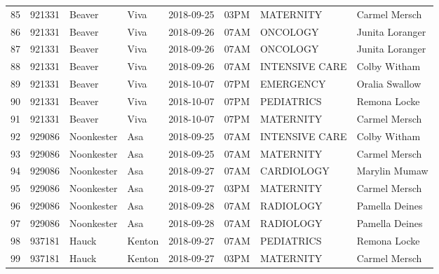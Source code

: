 \documentclass[11pt]{article}
\begin{document}
\begin{tabular}{|l|l|l|l|l|l|l|l|}
	85 &  921331 &      Beaver &      Viva &      2018-09-25 &  03PM &       MATERNITY &    Carmel Mersch \\
	86 &  921331 &      Beaver &      Viva &      2018-09-26 &  07AM &        ONCOLOGY &  Junita Loranger \\
	87 &  921331 &      Beaver &      Viva &      2018-09-26 &  07AM &        ONCOLOGY &  Junita Loranger \\
	88 &  921331 &      Beaver &      Viva &      2018-09-26 &  07AM &  INTENSIVE CARE &     Colby Witham \\
	89 &  921331 &      Beaver &      Viva &      2018-10-07 &  07PM &       EMERGENCY &   Oralia Swallow \\
	90 &  921331 &      Beaver &      Viva &      2018-10-07 &  07PM &      PEDIATRICS &     Remona Locke \\
	91 &  921331 &      Beaver &      Viva &      2018-10-07 &  07PM &       MATERNITY &    Carmel Mersch \\
	92 &  929086 &  Noonkester &       Asa &      2018-09-25 &  07AM &  INTENSIVE CARE &     Colby Witham \\
	93 &  929086 &  Noonkester &       Asa &      2018-09-25 &  07AM &       MATERNITY &    Carmel Mersch \\
	94 &  929086 &  Noonkester &       Asa &      2018-09-27 &  07AM &      CARDIOLOGY &    Marylin Mumaw \\
	95 &  929086 &  Noonkester &       Asa &      2018-09-27 &  03PM &       MATERNITY &    Carmel Mersch \\
	96 &  929086 &  Noonkester &       Asa &      2018-09-28 &  07AM &       RADIOLOGY &   Pamella Deines \\
	97 &  929086 &  Noonkester &       Asa &      2018-09-28 &  07AM &       RADIOLOGY &   Pamella Deines \\
	98 &  937181 &       Hauck &    Kenton &      2018-09-27 &  07AM &      PEDIATRICS &     Remona Locke \\
	99 &  937181 &       Hauck &    Kenton &      2018-09-27 &  03PM &       MATERNITY &    Carmel Mersch \\
	\bottomrule
\end{tabular}


\newpage
\end{document}

